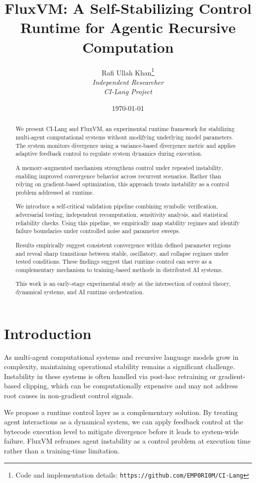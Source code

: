 \documentclass{article}
\title{FluxVM: A Self-Stabilizing Control Runtime for Agentic Recursive Computation}
\author{
Rafi Ullah Khan\thanks{Code and implementation details: \texttt{https://github.com/EMP0RI0M/CI-Lang}} \\
\textit{Independent Researcher} \\
\textit{CI-Lang Project}
}
\date{\today}
\begin{document}
\maketitle

\begin{abstract}
We present CI-Lang and FluxVM, an experimental runtime framework for stabilizing multi-agent computational systems without modifying underlying model parameters. The system monitors divergence using a variance-based divergence metric and applies adaptive feedback control to regulate system dynamics during execution.

A memory-augmented mechanism strengthens control under repeated instability, enabling improved convergence behavior across recurrent scenarios. Rather than relying on gradient-based optimization, this approach treats instability as a control problem addressed at runtime.

We introduce a self-critical validation pipeline combining symbolic verification, adversarial testing, independent recomputation, sensitivity analysis, and statistical reliability checks. Using this pipeline, we empirically map stability regimes and identify failure boundaries under controlled noise and parameter sweeps.

Results empirically suggest consistent convergence within defined parameter regions and reveal sharp transitions between stable, oscillatory, and collapse regimes under tested conditions. These findings suggest that runtime control can serve as a complementary mechanism to training-based methods in distributed AI systems.

This work is an early-stage experimental study at the intersection of control theory, dynamical systems, and AI runtime orchestration.
\end{abstract}

\section{Introduction}
As multi-agent computational systems and recursive language models grow in complexity, maintaining operational stability remains a significant challenge. Instability in these systems is often handled via post-hoc retraining or gradient-based clipping, which can be computationally expensive and may not address root causes in non-gradient control signals.

We propose a runtime control layer as a complementary solution. By treating agent interactions as a dynamical system, we can apply feedback control at the bytecode execution level to mitigate divergence before it leads to system-wide failure. FluxVM reframes agent instability as a control problem at execution time rather than a training-time limitation.
\end{document}
